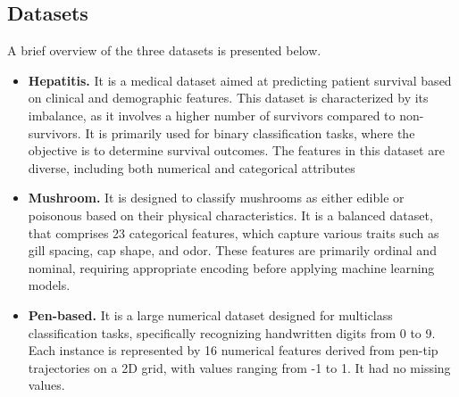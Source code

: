 \subsection{Datasets}
A brief overview of the three datasets is presented below.
\begin{itemize}
    \item \textbf{Hepatitis.} It is a medical dataset aimed at predicting patient survival based on clinical and demographic features. 
    This dataset is characterized by its imbalance, as it involves a higher number of survivors compared to non-survivors. It 
    is primarily used for binary classification tasks, where the objective is to determine survival outcomes. The features in 
    this dataset are diverse, including both numerical and categorical attributes
    \item \textbf{Mushroom.} It is designed to classify mushrooms as either edible or poisonous based on their physical 
    characteristics. It is a balanced dataset, that comprises 23 categorical features, which capture various traits such as gill spacing, cap shape, and odor. 
    These features are primarily ordinal and nominal, requiring appropriate encoding before applying machine learning models.
    \item \textbf{Pen-based.} It is a large numerical dataset designed for multiclass classification tasks, specifically recognizing handwritten 
    digits from 0 to 9. Each instance is represented by 16 numerical features derived from pen-tip trajectories on a 2D grid,
    with values ranging from -1 to 1. It had no missing values.
\end{itemize}


